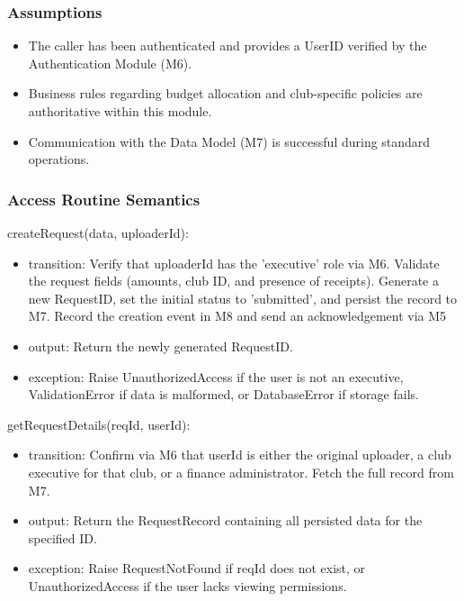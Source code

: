 \documentclass[12pt, titlepage]{article}
\begin{document}
\subsubsection{Assumptions}

\begin{itemize}
  \item The caller has been authenticated and provides a UserID verified by the Authentication Module (M6).
  \item Business rules regarding budget allocation and club-specific policies are authoritative within this module.
  \item Communication with the Data Model (M7) is successful during standard operations.
\end{itemize}

\subsubsection{Access Routine Semantics}

\noindent createRequest(data, uploaderId):
\begin{itemize}
  \item transition: Verify that uploaderId has the 'executive' role via M6. Validate the request fields (amounts, club ID, and presence of receipts). Generate a new RequestID, set the initial status to 'submitted', and persist the record to M7. Record the creation event in M8 and send an acknowledgement via M5
  \item output: Return the newly generated RequestID.
  \item exception: Raise UnauthorizedAccess if the user is not an executive, ValidationError if data is malformed, or DatabaseError if storage fails.
\end{itemize}

\noindent getRequestDetails(reqId, userId):
\begin{itemize}
  \item transition: Confirm via M6 that userId is either the original uploader, a club executive for that club, or a finance administrator. Fetch the full record from M7.
  \item output: Return the RequestRecord containing all persisted data for the specified ID.
  \item exception: Raise RequestNotFound if reqId does not exist, or UnauthorizedAccess if the user lacks viewing permissions.
\end{itemize}
\end{document}
